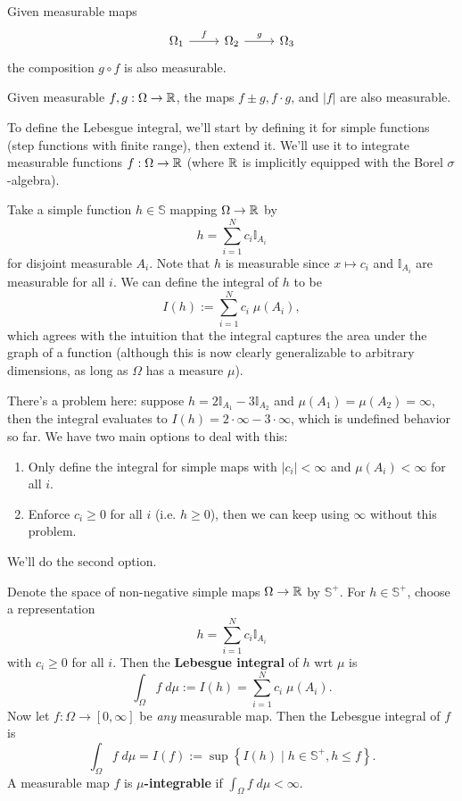 \documentclass[twoside,10pt]{article}
\begin{document}
\begin{prop}
Given measurable maps
\[\begin{tikzcd}
	{\Omega_1} & {\Omega_2} & {\Omega_3}
	\arrow["f", from=1-1, to=1-2]
	\arrow["g", from=1-2, to=1-3]
\end{tikzcd}\]
the composition $g \circ f$ is also measurable.
\end{prop}

\begin{ex}[]
Given measurable $f,g: \Omega \to \mathbb{R}$, the maps $f \pm g, f\cdot g$, and $|f|$ are also measurable.
\end{ex}

To define the Lebesgue integral, we'll start by defining it for simple functions (step functions with finite range), then extend it. We'll use it to integrate measurable functions $f:\Omega \to \mathbb{R}$ (where $\mathbb{R}$ is implicitly equipped with the Borel $\sigma$-algebra).

Take a simple function $h \in \mathbb{S}$ mapping $\Omega \to \mathbb{R}$ by
\[
h = \sum_{i=1}^{N} c_{i}\mathbb{I}_{A_{i}}
\] for disjoint measurable $A_{i}$. Note that $h$ is measurable since $x \mapsto c_{i}$ and $\mathbb{I}_{A_{i}}$ are measurable for all $i$. We can define the integral of $h$ to be
\[
I(h) := \sum_{i=1}^{N} c_{i} \; \mu(A_{i}),
\] which agrees with the intuition that the integral captures the area under the graph of a function (although this is now clearly generalizable to arbitrary dimensions, as long as $\Omega$ has a measure $\mu$).

There's a problem here: suppose $h = 2 \mathbb{I}_{A_{1}} - 3 \mathbb{I}_{A_2}$ and $\mu(A_1) = \mu(A_2) = \infty$, then the integral evaluates to $I(h) = 2\cdot\infty - 3\cdot\infty$, which is undefined behavior so far. We have two main options to deal with this:
\begin{enumerate}
	\item Only define the integral for simple maps with $|c_{i}| < \infty$ and $\mu(A_{i}) < \infty$ for all $i$.
	\item Enforce $c_{i} \geq 0$ for all $i$ (i.e. $h \geq 0$), then we can keep using $\infty$ without this problem.
\end{enumerate}
We'll do the second option.


\begin{defn}[]
Denote the space of non-negative simple maps $\Omega \to \mathbb{R}$ by $\mathbb{S}^{+}$. For $h \in \mathbb{S}^{+}$, choose a representation
\[
h = \sum_{i=1}^{N} c_{i} \mathbb{I}_{A_{i}}
\] with $c_{i} \geq 0$ for all $i$. Then the \textbf{Lebesgue integral} of $h$ wrt $\mu$ is
\[
	\int_{\Omega} f\;d\mu := I(h) = \sum_{i=1}^{N} c_{i}\; \mu(A_{i}).
\] 
Now let $f: \Omega \to [0,\infty]$ be \textit{any} measurable map. Then the Lebesgue integral of $f$ is
\[
\int_{\Omega} f\;d\mu = I(f) := \sup \left\{ I(h) \;|\; h \in \mathbb{S}^{+}, h\leq f \right\}.
\] A measurable map $f$ is \textbf{$\mu$-integrable} if $\int_{\Omega} f\;d\mu < \infty$.
\end{defn}
\end{document}
